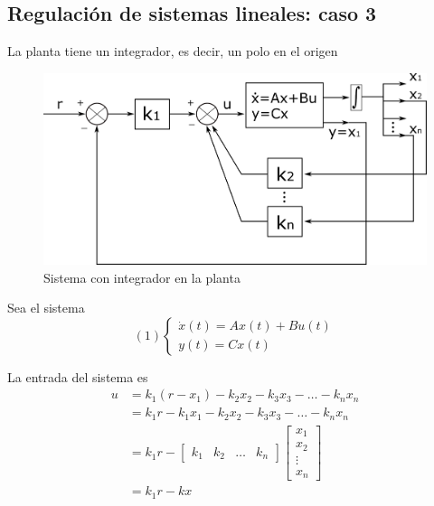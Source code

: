 \subsection{Regulación de sistemas lineales: caso 3}

La planta tiene un integrador, es decir, un polo en el origen

\begin{figure}[h!]
    \centering
        \includegraphics[scale=0.17]{Control de Sistemas Mecatronicos Figuras/16 Con integrador en la Planta.png}
        \caption{Sistema con integrador en la planta}
\end{figure}

Sea el sistema 
\[
    (1)
    \left\{
        \begin{array}{lll}
            \dot{x}(t) = Ax(t) + Bu(t) \\
            y(t) = Cx(t)
        \end{array}
    \right.
\]

La entrada del sistema es
\[
    \begin{split}
        u & = k_{1}(r - x_{1}) - k_{2}x_{2} - k_{3}x_{3} - \ldots - k_{n}x_{n} \\
        & = k_{1}r - k_{1}x_{1} - k_{2}x_{2} - k_{3}x_{3} - \ldots - k_{n}x_{n} \\
        & = k_{1}r - 
        \begin{bmatrix}
            k_{1} & k_{2} & \ldots & k_{n}
        \end{bmatrix}
        \begin{bmatrix}
            x_{1} \\ x_{2} \\ \vdots \\ x_{n}
        \end{bmatrix} \\
        & = k_{1}r - kx
    \end{split}
\]

